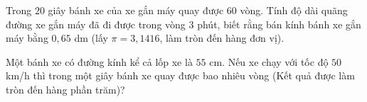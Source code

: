 \begin{bt}%
	Trong $20$ giây bánh xe của xe gắn máy quay được $60$ vòng. Tính độ dài quãng đường xe gắn máy đã đi được trong vòng $3$ phút, biết rằng bán kính bánh xe gắn máy bằng $0{,}65 $ dm (lấy $\pi=3{,}1416$, làm tròn đến hàng đơn vị).
\end{bt}

%			


\begin{bt}%
	Một bánh xe có đường kính kể cả lốp xe là $55$ cm. Nếu xe chạy với tốc độ $50$  km/h thì trong một giây bánh xe quay được bao nhiêu vòng (Kết quả được làm tròn đến hàng phần trăm)?
\end{bt}
\newpage

